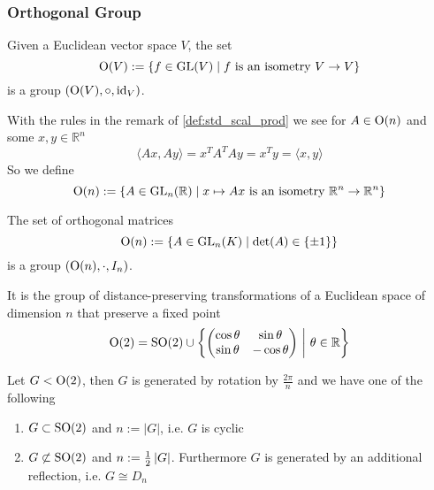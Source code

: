 \subsubsection{Orthogonal Group}
\begin{proposition}
   Given a Euclidean vector space \(V\), the set
   \[\operatorname{O}(V) := \{f \in \operatorname{GL}(V) \mid f~\text{is an isometry}~V \to V\}\]
   is a group \((\operatorname{O}(V), \circ, \operatorname{id}_V)\).
\end{proposition}
With the rules in the remark of \cref{def:std_scal_prod} we see for \(A \in \operatorname{O}(n)\) and some \(x, y \in \mathbb{R}^n\)
\[\langle Ax, Ay\rangle = x^TA^TAy = x^Ty = \langle x, y\rangle\]
So we define
\[\operatorname{O}(n) := \{A \in \operatorname{GL}_n(\mathbb{R}) \mid x \mapsto Ax~\text{is an isometry}~\mathbb{R}^n \to \mathbb{R}^n\}\]
\begin{proposition}
   The set of orthogonal matrices
   \[\operatorname{O}(n) := \{A \in \operatorname{GL}_n(K) \mid \det(A) \in \{\pm 1\}\}\]
   is a group \((\operatorname{O}(n), \cdot, I_n)\).
\end{proposition}
\begin{remark}
   It is the group of distance-preserving transformations of a Euclidean space of dimension \(n\) that preserve a fixed point
   \[\operatorname{O}(2) = \operatorname{SO}(2) \cup \left\{\begin{pmatrix}\cos\theta & \sin\theta\\ \sin\theta & -\cos\theta\end{pmatrix} ~\middle|~ \theta \in \mathbb{R}\right\}\]
\end{remark}

\begin{proposition}
   Let \(G < \operatorname{O}(2)\), then \(G\) is generated by rotation by \(\frac{2\pi}{n}\) and we have one of the following
   \begin{enumerate}[label=\roman*, align=Center]
      \item \(G \subset \operatorname{SO}(2)\) and \(n := |G|\), i.e. \(G\) is cyclic
      \item \(G \not\subset \operatorname{SO}(2)\) and \(n := \frac{1}{2} \left\lvert G\right\rvert\).
         Furthermore \(G\) is generated by an additional reflection, i.e. \(G \cong D_n\)
   \end{enumerate}
\end{proposition}

